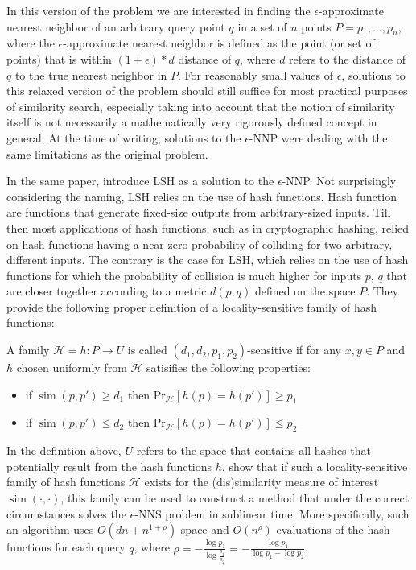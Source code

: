 In this version of the problem we are interested in finding the $\epsilon$-approximate nearest neighbor of an arbitrary query point $q$ in a set of $n$ points $P = {p_1,...,p_n}$, where the $\epsilon$-approximate nearest neighbor is defined as the point (or set of points) that is within $(1 + \epsilon) * d$ distance of $q$, where $d$ refers to the distance of $q$ to the true nearest neighbor in $P$. For reasonably small values of $\epsilon$, solutions to this relaxed version of the problem should still suffice for most practical purposes of similarity search, especially taking into account that the notion of similarity itself is not necessarily a mathematically very rigorously defined concept in general. At the time of writing, solutions to the $\epsilon$-NNP were dealing with the same limitations as the original problem. 

In the same paper, \cite{IndykM98} introduce LSH as a solution to the $\epsilon$-NNP. Not surprisingly considering the naming, LSH relies on the use of hash functions. Hash function are functions that generate fixed-size outputs from arbitrary-sized inputs. Till then most applications of hash functions, such as in cryptographic hashing, relied on hash functions having a near-zero probability of colliding for two arbitrary, different inputs. The contrary is the case for LSH, which relies on the use of hash functions for which the probability of collision is much higher for inputs $p$, $q$ that are closer together according to a metric $d(p,q)$ defined on the space $P$. They provide the following proper definition of a locality-sensitive family of hash functions:
\begin{definition}\label{def:LSH}
    A family $\mathcal{H} = {h: P\rightarrow U} $ is called $(d_1, d_2, p_1, p_2)$-sensitive if for any $x,y \in P$ and $h$ chosen uniformly from $\mathcal{H}$ satisifies the following properties:
\begin{itemize}
    \item if $\operatorname{sim}(p, p') \geq d_1$ then $\operatorname{Pr_{\mathcal{H}}}[h(p)=h(p')] \geq p_1$
    \item if $\operatorname{sim}(p, p') \leq d_2$ then $\operatorname{Pr_{\mathcal{H}}}[h(p)=h(p')] \leq p_2$
\end{itemize}
\end{definition}
In the definition above, $U$ refers to the space that contains all hashes that potentially result from the hash functions $h$.
\cite{IndykM98} show that if such a locality-sensitive family of hash functions $\mathcal{H}$ exists for the (dis)similarity measure of interest $\operatorname{sim}(\cdot, \cdot)$, this family can be used to construct a method that under the correct circumstances solves the $\epsilon$-NNS problem in sublinear time. More specifically, such an algorithm uses $O(dn + n^{1+\rho})$ space and $O(n^{\rho})$ evaluations of the hash functions for each query $q$, where $\rho = - \frac{\log{p_1}}{\log{\frac{p_1}{p_2}}} = - \frac{\log{p_1}}{\log{p_1} - \log{p_2}}$.

